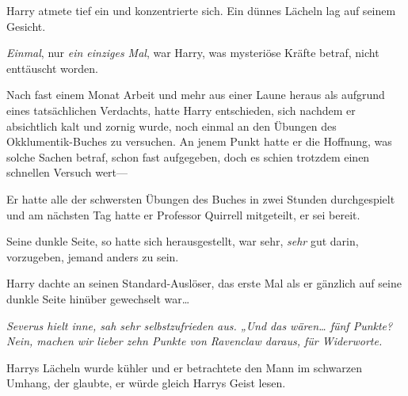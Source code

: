 Harry atmete tief ein und konzentrierte sich. Ein dünnes Lächeln lag auf seinem Gesicht.

\emph{Einmal}, nur \emph{ein einziges Mal}, war Harry, was mysteriöse Kräfte betraf, nicht enttäuscht worden.

Nach fast einem Monat Arbeit und mehr aus einer Laune heraus als aufgrund eines tatsächlichen Verdachts, hatte Harry entschieden, sich nachdem er absichtlich kalt und zornig wurde, noch einmal an den Übungen des Okklumentik-Buches zu versuchen. An jenem Punkt hatte er die Hoffnung, was solche Sachen betraf, schon fast aufgegeben, doch es schien trotzdem einen schnellen Versuch wert—

Er hatte alle der schwersten Übungen des Buches in zwei Stunden durchgespielt und am nächsten Tag hatte er Professor Quirrell mitgeteilt, er sei bereit.

Seine dunkle Seite, so hatte sich herausgestellt, war sehr, \emph{sehr} gut darin, vorzugeben, jemand anders zu sein.

Harry dachte an seinen Standard-Auslöser, das erste Mal als er gänzlich auf seine dunkle Seite hinüber gewechselt war…

\emph{Severus hielt inne, sah sehr selbstzufrieden aus. „Und das wären… fünf Punkte? Nein, machen wir lieber zehn Punkte von Ravenclaw daraus, für Widerworte.}

Harrys Lächeln wurde kühler und er betrachtete den Mann im schwarzen Umhang, der glaubte, er würde gleich Harrys Geist lesen.

